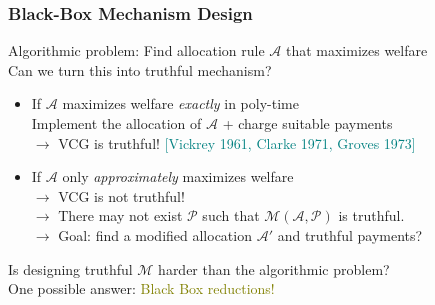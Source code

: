 \documentclass[hyperref={pdfpagelabels=false}]{beamer}
\renewcommand{\footnotesize}{\scriptsize}
\newcommand{\refscolorz}{teal} %
\newcommand\Algo{\mathcal{A}}
\newcommand\Pay{\mathcal{P}}
\newcommand\Mech{\mathcal{M}}
\begin{document}
\begin{frame} 
	\frametitle{Black-Box Mechanism Design}
	
	Algorithmic problem: Find allocation rule $\Algo$ that maximizes welfare\\	
	Can we turn this into truthful mechanism?\\
\pause
	\begin{figure}[!h]
		\centering
			
	\end{figure}
	\pause
	\begin{itemize}
		\item If $\Algo$ maximizes welfare \emph{exactly} in poly-time\\
			Implement the allocation of $\Algo$ + charge suitable payments \\
			$\rightarrow$ VCG is truthful! 
	{\footnotesize \textcolor{\refscolorz}{[Vickrey 1961, Clarke 1971, Groves	1973]}}



		\item If $\Algo$ only \emph{approximately} maximizes welfare\\
				\pause
				$\rightarrow$ VCG is not truthful! \\
        $\rightarrow$ There may not exist $\Pay$  such that $\Mech(\Algo,\Pay)$ is truthful.\\
$\rightarrow $ Goal: find a modified allocation $\Algo'$ and truthful payments?
	\end{itemize}	
	
	Is designing truthful $\Mech$ harder than the algorithmic problem? \\
	\pause
			 One possible answer: \textcolor{olive}{Black Box reductions!} \\


\end{frame}
\end{document}
